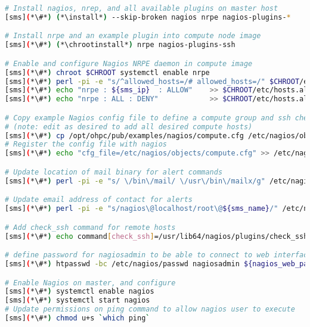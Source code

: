 \begin{lstlisting}[language=bash,keywords={},upquote=true]
# Install nagios, nrep, and all available plugins on master host
[sms](*\#*) (*\install*) --skip-broken nagios nrpe nagios-plugins-*

# Install nrpe and an example plugin into compute node image
[sms](*\#*) (*\chrootinstall*) nrpe nagios-plugins-ssh

# Enable and configure Nagios NRPE daemon in compute image
[sms](*\#*) chroot $CHROOT systemctl enable nrpe
[sms](*\#*) perl -pi -e "s/^allowed_hosts=/# allowed_hosts=/" $CHROOT/etc/nagios/nrpe.cfg
[sms](*\#*) echo "nrpe : ${sms_ip}  : ALLOW"    >> $CHROOT/etc/hosts.allow
[sms](*\#*) echo "nrpe : ALL : DENY"            >> $CHROOT/etc/hosts.allow

# Copy example Nagios config file to define a compute group and ssh check
# (note: edit as desired to add all desired compute hosts)
[sms](*\#*) cp /opt/ohpc/pub/examples/nagios/compute.cfg /etc/nagios/objects
# Register the config file with nagios
[sms](*\#*) echo "cfg_file=/etc/nagios/objects/compute.cfg" >> /etc/nagios/nagios.cfg

# Update location of mail binary for alert commands
[sms](*\#*) perl -pi -e "s/ \/bin\/mail/ \/usr\/bin\/mailx/g" /etc/nagios/objects/commands.cfg

# Update email address of contact for alerts
[sms](*\#*) perl -pi -e "s/nagios\@localhost/root\@${sms_name}/" /etc/nagios/objects/contacts.cfg

# Add check_ssh command for remote hosts
[sms](*\#*) echo command[check_ssh]=/usr/lib64/nagios/plugins/check_ssh localhost $CHROOT/etc/nagios/nrpe.cfg

# define password for nagiosadmin to be able to connect to web interface
[sms](*\#*) htpasswd -bc /etc/nagios/passwd nagiosadmin ${nagios_web_password}

# Enable Nagios on master, and configure
[sms](*\#*) systemctl enable nagios
[sms](*\#*) systemctl start nagios
# Update permissions on ping command to allow nagios user to execute
[sms](*\#*) chmod u+s `which ping`
\end{lstlisting}

